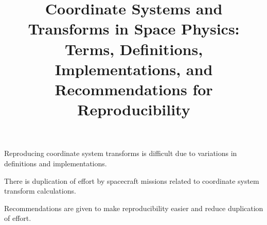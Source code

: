\documentclass[draft]{agujournal2019}
\begin{document}
\title{Coordinate Systems and Transforms in Space Physics: Terms, Definitions,  Implementations, and Recommendations for Reproducibility}





\noindent




\begin{keypoints}
\item Reproducing coordinate system transforms is difficult due to variations in definitions and implementations.
\item There is duplication of effort by spacecraft missions related to coordinate system transform calculations.
\item Recommendations are given to make reproducibility easier and reduce duplication of effort.
\end{keypoints}
\end{document}
